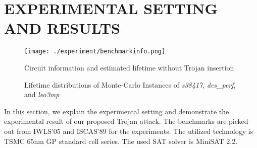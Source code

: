 \section{EXPERIMENTAL SETTING AND RESULTS}
\label{sec:mot}
\begin{figure}
	\centering
	\texttt{[image: ./experiment/benchmarkinfo.png]}
	\caption{Circuit information and estimated lifetime without Trojan insertion}
	\label{fig:benchmark}
\end{figure}

\begin{figure*}[!ht]
    \centering
    \hspace{0.1cm}
    \hspace{0.1cm}
    \hspace{0.1cm}
    \caption{Lifetime distributions of Monte-Carlo Instances of \textit{s38417}, \textit{des\_perf}, and \textit{leo3mp}}
    \label{fig:exp}
\end{figure*}


In this section, we explain the experimental setting and demonstrate the experimental result of our proposed Trojan attack. The benchmarks are picked out from IWLS'05 and ISCAS'89 for the experiments. The utilized technology is TSMC 65nm GP standard cell series. The used SAT solver is MiniSAT 2.2. %

